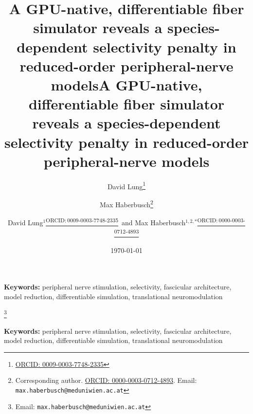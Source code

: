 \documentclass[a4paper,11pt]{article}
\providecommand{\articletype}[1]{}
\providecommand{\orcid}[1]{\href{https://orcid.org/#1}{\textsuperscript{ORCID:\,#1}}}
\providecommand{\email}[1]{\thanks{Email: \texttt{#1}}}
\providecommand{\keywords}[1]{\par\noindent\textbf{Keywords:} #1\par}
\begin{document}
\ifx\jneSubmission\undefined
  \title{A GPU-native, differentiable fiber simulator reveals a
         species-dependent selectivity penalty in reduced-order
         peripheral-nerve models}
  \author{David Lung\thanks{\href{https://orcid.org/0009-0003-7748-2335}{ORCID: 0009-0003-7748-2335}}}
  \author{Max Haberbusch\thanks{Corresponding author. \href{https://orcid.org/0000-0003-0712-4893}{ORCID: 0000-0003-0712-4893}.
                                 Email: \texttt{max.haberbusch@meduniwien.ac.at}}}
  \date{\today}
  \maketitle

  \begin{abstract}
  
  \end{abstract}

  \keywords{peripheral nerve stimulation, selectivity, fascicular
            architecture, model reduction, differentiable simulation,
            translational neuromodulation}
\else
  \articletype{Paper}

  \title{A GPU-native, differentiable fiber simulator reveals a
         species-dependent selectivity penalty in reduced-order
         peripheral-nerve models}

  \author{David Lung$^{1}$\orcid{0009-0003-7748-2335}\ and
          Max Haberbusch$^{1,2,*}$\orcid{0000-0003-0712-4893}}




  \email{max.haberbusch@meduniwien.ac.at}

  \keywords{peripheral nerve stimulation, selectivity, fascicular
            architecture, model reduction, differentiable simulation,
            translational neuromodulation}
\end{document}
